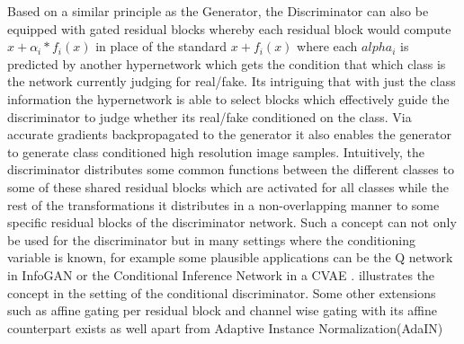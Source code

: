 Based on a similar principle as the Generator, the Discriminator can also be equipped with gated residual blocks whereby each residual block would compute $x+\alpha_i*f_i(x)$ in place of the standard $x+f_i(x)$ where each $alpha_i$ is predicted by another hypernetwork which gets the condition that which class is the network currently judging for real/fake. Its intriguing that with just the class information the hypernetwork is able to select blocks which effectively guide the discriminator to judge whether its real/fake conditioned on the class. Via accurate gradients backpropagated to the generator it also enables the generator to generate class conditioned high resolution image samples. Intuitively, the discriminator distributes some common functions between the different classes to some of these shared residual blocks which are activated for all classes while the rest of the transformations it distributes in a non-overlapping manner to some specific residual blocks of the discriminator network. Such a concept can not only be used for the discriminator but in many settings where the conditioning variable is known, for example some plausible applications can be the Q network in InfoGAN\cite{chen2016infogan} or the Conditional Inference Network in a CVAE \cite{sohn2015learning}.  illustrates the concept in the setting of the conditional discriminator. Some other extensions such as affine gating per residual block and channel wise gating with its affine counterpart exists as well apart from Adaptive Instance Normalization(AdaIN) \cite{huang2017arbitrary}
